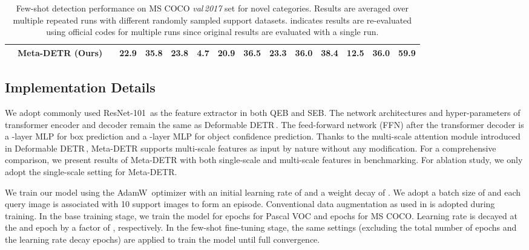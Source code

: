 \documentclass[10pt,twocolumn,letterpaper]{article}
\begin{document}
\begin{table*}[t]
\begin{center}
{\begin{tabular}[t]{c|cc|cccccc|cccccc}
& \cellcolor{black!6} Meta-DETR (Ours) & \cellcolor{black!6} & \cellcolor{black!6}\textbf{22.9} & \cellcolor{black!6}35.8 & \cellcolor{black!6}\textbf{23.8} & \cellcolor{black!6}\textbf{4.7} & \cellcolor{black!6}\textbf{20.9} & \cellcolor{black!6}\textbf{36.5} & \cellcolor{black!6}\textbf{23.3} & \cellcolor{black!6}\textbf{36.0} & \cellcolor{black!6}\textbf{38.4} & \cellcolor{black!6}\textbf{12.5} & \cellcolor{black!6}\textbf{36.0} & \cellcolor{black!6}\textbf{59.9} \\

\bottomrule[1.1pt]

\end{tabular}
}
\end{center}
\vspace*{-1.25mm}
\caption{Few-shot detection performance on MS COCO \textit{val\,2017} set for novel categories. Results are averaged over multiple repeated runs with different randomly sampled support datasets.  indicates results are re-evaluated using official codes for multiple runs since original results are evaluated with a single run.}
\label{tab:Performance_COCO_novel}
\vspace*{-1.5mm}
\end{table*}







\subsection{Implementation Details} \label{sec:imple_details}

We adopt commonly used ResNet-101\,\cite{resnet} as the feature extractor in both QEB and SEB. The network architectures and hyper-parameters of transformer encoder and decoder remain the same as Deformable DETR\,\cite{DeformableDETR}. The feed-forward network (FFN) after the transformer decoder is a -layer MLP for box prediction and a -layer MLP for object confidence prediction.
Thanks to the multi-scale attention module introduced in Deformable DETR\,\cite{DeformableDETR}, Meta-DETR supports multi-scale features as input by nature without any modification. For a comprehensive comparison, we present results of Meta-DETR with both single-scale and multi-scale features in benchmarking. For ablation study, we only adopt the single-scale setting for Meta-DETR.

We train our model using the AdamW\,\cite{Adam,AdamW} optimizer with an initial learning rate of  and a weight decay of . We adopt a batch size of  and each query image is associated with 10 support images to form an episode. Conventional data augmentation as used in \cite{DETR,DeformableDETR} is adopted during training. In the base training stage, we train the model for  epochs for Pascal VOC and  epochs for MS COCO. Learning rate is decayed at the  and  epoch by a factor of , respectively. In the few-shot fine-tuning stage, the same settings (excluding the total number of epochs and the learning rate decay epochs) are applied to train the model until full convergence.
\end{document}
